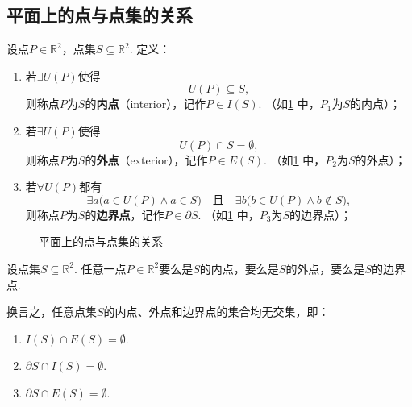 \subsection{平面上的点与点集的关系}
\begin{definition}
设点\(P\in\mathbb{R}^2\)，点集\(S\subseteq\mathbb{R}^2\).
定义：\begin{enumerate}
\item 若\(\exists U(P)\)使得\[
U(P) \subseteq S,
\]则称点\(P\)为\(S\)的\textbf{内点}（interior），记作\(P \in I(S)\).
（如\cref{figure:集合论.平面上的点与点集的关系} 中，\(P_1\)为\(S\)的内点）；

\item 若\(\exists U(P)\)使得\[
U(P) \cap S = \emptyset,
\]则称点\(P\)为\(S\)的\textbf{外点}（exterior），记作\(P \in E(S)\).
（如\cref{figure:集合论.平面上的点与点集的关系} 中，\(P_2\)为\(S\)的外点）；

\item 若\(\forall U(P)\)都有\[
\exists a \bigl( a \in U(P) \land a \in S \bigr)
\quad\text{且}\quad
\exists b \bigl( b \in U(P) \land b \notin S \bigr),
\]则称点\(P\)为\(S\)的\textbf{边界点}，记作\(P \in \partial{S}\).
（如\cref{figure:集合论.平面上的点与点集的关系} 中，\(P_3\)为\(S\)的边界点）；
\end{enumerate}

\begin{figure}[ht]
\centering
{}
\caption{平面上的点与点集的关系}
\label{figure:集合论.平面上的点与点集的关系}
\end{figure}
\end{definition}

\begin{property}
设点集\(S\subseteq\mathbb{R}^2\).
任意一点\(P\in\mathbb{R}^2\)要么是\(S\)的内点，要么是\(S\)的外点，要么是\(S\)的边界点.

换言之，任意点集\(S\)的内点、外点和边界点的集合均无交集，即：
\begin{enumerate}
\item \(I(S) \cap E(S) = \emptyset\).
\item \(\partial{S} \cap I(S) = \emptyset\).
\item \(\partial{S} \cap E(S) = \emptyset\).
\end{enumerate}
\end{property}

